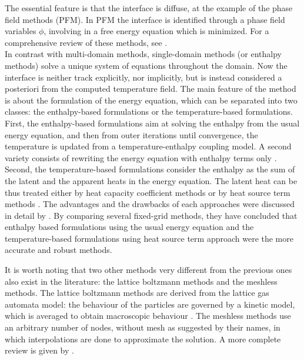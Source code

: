The essential feature is that the interface is diffuse, 
at the example of the phase field methods (PFM). 
In PFM the interface is identified through a phase field variables $\phi$, involving in a free energy equation which is minimized. For a comprehensive review of these methods, see \citep{fix1982phase,davis2001theory,boettinger2002phase,singer2008phase}.\\
In contrast with multi-domain methods, single-domain methods (or enthalpy methods) solve a unique system of equations throughout the domain. 
Now the interface is neither track explicitly, nor implicitly, but is instead considered a posteriori from the computed temperature field.
The main feature of the method is about the formulation of the energy equation, which can be separated into two classes:
the enthalpy-based formulations or the temperature-based formulations.
First, the enthalpy-based formulations \citep{eyres1946calculation,rose1960method,bhattacharya2014enthalpy} aim at solving the enthalpy from the usual energy equation, and then from outer iterations until convergence, the temperature is updated from a temperature-enthalpy coupling model. 
A second variety consists of rewriting the energy equation with enthalpy terms only \citep{rady1996natural,hannoun2003resolving}.
Second, the temperature-based formulations consider the enthalpy as the sum of the latent and the apparent heats in the energy equation. 
The latent heat can be thus treated either by heat capacity coefficient methods \citep{gau1984melting,szekely1970effect,chiesa1974natural} or by heat source term methods \citep{Tenchev2005,swaminathan1997towards,dan-2014-JCP}.
The advantages and the drawbacks of each approaches were discussed in detail by \cite{konig2017comprehensive}.
By comparing several fixed-grid methods, they have concluded that enthalpy based formulations using the usual energy equation and the temperature-based formulations using heat source term approach were the more accurate and robust methods. 

It is worth noting that two other methods very different from the previous ones also exist in the literature:
the lattice boltzmann methods and the meshless methods.
The lattice boltzmann methods are derived from the lattice gas automata model: the behaviour of the particles are governed by a kinetic model, which is averaged to obtain macroscopic behaviour \citep{frisch1986lattice,luo2015lattice,gong2015numerical}.
The meshless methods use an arbitrary number of nodes, without mesh as suggested by their names, in which interpolations are done to approximate the solution. A more complete review is given by \cite{atluri2002meshless}.


